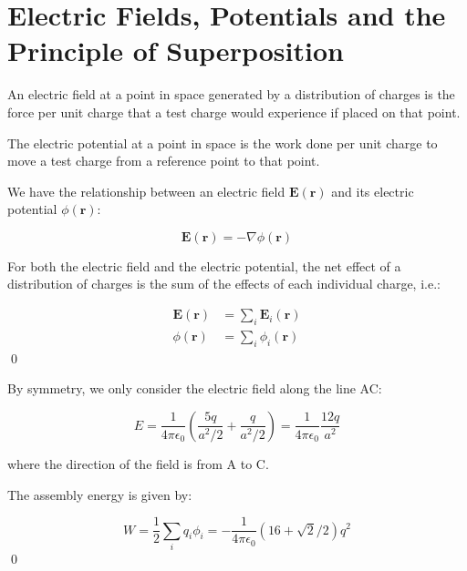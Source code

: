 \documentclass[12pt]{article}
\begin{document}



\pagebreak
\section*{Electric Fields, Potentials and the Principle of Superposition}


An electric field at a point in space generated by a distribution of charges is the force per unit charge that a test charge would experience if placed on that point.

The electric potential at a point in space is the work done per unit charge to move a test charge from a reference point to that point.

We have the relationship between an electric field $\mathbf{E}(\mathbf{r})$ and its electric potential $\phi(\mathbf{r})$:

\begin{equation}
    \mathbf{E}(\mathbf{r}) = -\nabla \phi(\mathbf{r})
\end{equation}

For both the electric field and the electric potential, the net effect of a distribution of charges is the sum of the effects of each individual charge, i.e.:

\begin{equation}
\begin{split}
    \mathbf{E}(\mathbf{r}) &= \sum_{i} \mathbf{E}_{i}(\mathbf{r}) \\
    \phi(\mathbf{r}) &= \sum_{i} \phi_{i}(\mathbf{r})
\end{split}
\end{equation}
\qed



By symmetry, we only consider the electric field along the line AC:

\begin{equation}
    E = \frac{1}{4\pi\epsilon_{0}} \left( \frac{5q}{a^{2}/2} + \frac{q}{a^{2}/2} \right) = \frac{1}{4\pi\epsilon_{0}} \frac{12q}{a^{2}}
\end{equation}

where the direction of the field is from A to C.

The assembly energy is given by:

\begin{equation}
    W = \frac{1}{2} \sum_{i} q_{i} \phi_{i} = -\frac{1}{4\pi\epsilon_{0}} (16 + \sqrt{2}/2)q^{2}
\end{equation}
\qed
\end{document}
